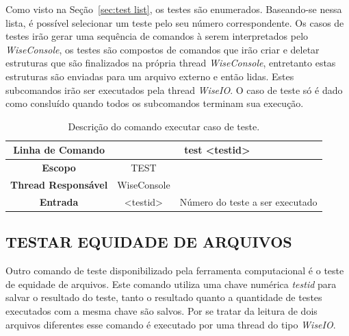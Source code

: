 \documentclass[a4paper,12pt]{monografia}
\theoremstyle{plain}
\theoremstyle{definition}
\theoremstyle{remark}
\begin{document}
Como visto na Seção~\ref{sec:test list}, os testes são enumerados. Baseando-se nessa lista, é possível selecionar um teste pelo seu número correspondente. Os casos de testes irão gerar uma sequência de comandos à serem interpretados pelo \textit{WiseConsole}, os testes são compostos de comandos que irão criar e deletar estruturas que são finalizados na própria thread \textit{WiseConsole}, entretanto estas estruturas são enviadas para um arquivo externo e então lidas. Estes subcomandos irão ser executados pela thread \textit{WiseIO}. O caso de teste só é dado como consluído quando todos os subcomandos terminam sua execução.

\begin{center}
	\begin{table}[!htbp]
	\begin{tabular}{|c|c|m{}|}
		\hline
		\textbf{Linha de Comando} & \multicolumn{2}{c|}{test <test\underline{\space}id>} \\
		\hline
		\textbf{Escopo} & \multicolumn{1}{c|}{TEST} \\
		\hline
		\textbf{Thread Responsável} & \multicolumn{1}{c|}{WiseConsole} \\
		\hline
		\textbf{Entrada} & <test\underline{\space}id> & Número do teste a ser executado \\
		\hline
	\end{tabular}
	\caption{Descrição do comando executar caso de teste.}
	\label{tab:case_test}
	\end{table}
\end{center}

\subsection{TESTAR EQUIDADE DE ARQUIVOS}\label{sec:test_file}

Outro comando de teste disponibilizado pela ferramenta computacional é o teste de equidade de arquivos. Este comando utiliza uma chave numérica \textit{test\underline{\space}id} para salvar o resultado do teste, tanto o resultado quanto a quantidade de testes executados com a mesma chave são salvos. Por se tratar da leitura de dois arquivos diferentes esse comando é executado por uma thread do tipo \textit{WiseIO}.
\end{document}
